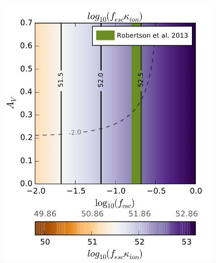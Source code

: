 \begin{landscape}
\begin{figure}
  \includegraphics[width=0.25\paperheight]{plots/Fig5c.pdf}


\end{figure}
\end{landscape}
